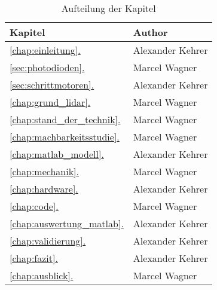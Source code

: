 \setpagestylefoot
\renewcommand{\thefigure}{A\arabic{figure}}
\renewcommand\thelstlisting{A\arabic{lstlisting}}
\renewcommand\thetable{A\arabic{table}}
\newcommand*{\fullref}[1]{\hyperref[{#1}]{\ref*{#1}. \nameref*{#1}}} 


\addchap{\langanhang}



\ifliteratur
    \printbibliography[heading=subbibintoc]
\fi

\ifglossar
    \printglossary[style=altlist,title=\langglossar]
\fi

\newpage
{}
\begin{table}[H]
	\centering
	\caption{Aufteilung der Kapitel}
	\begin{tabular}{|l|l|}
		\hline
		\textbf{Kapitel} & \textbf{Author} \\\hline
		\fullref{chap:einleitung} & Alexander Kehrer \\\hline
		\fullref{sec:photodioden} & Marcel Wagner \\\hline
		\fullref{sec:schrittmotoren} & Alexander Kehrer \\\hline
		\fullref{chap:grund_lidar} & Marcel Wagner \\\hline
		\fullref{chap:stand_der_technik} & Marcel Wagner\\\hline
		\fullref{chap:machbarkeitsstudie} & Marcel Wagner \\\hline
		\fullref{chap:matlab_modell} & Alexander Kehrer \\\hline
		\fullref{chap:mechanik} & Marcel Wagner \\\hline
		\fullref{chap:hardware} & Alexander Kehrer \\\hline
		\fullref{chap:code} & Marcel Wagner \\\hline
		\fullref{chap:auswertung_matlab} & Alexander Kehrer \\\hline
		\fullref{chap:validierung} & Alexander Kehrer \\\hline
		\fullref{chap:fazit} & Alexander Kehrer \\\hline
		\fullref{chap:ausblick} & Marcel Wagner \\\hline
	\end{tabular}
\end{table}

